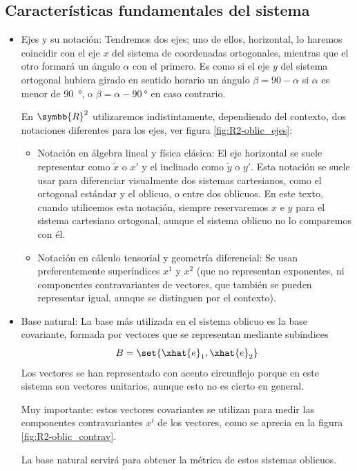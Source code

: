 \subsection{Características fundamentales del sistema}
\begin{itemize}
\item Ejes y su notación:
  Tendremos dos ejes; uno de ellos, horizontal, lo haremos coincidir con el eje $x$
  del sistema de coordenadas ortogonales, mientras que el otro formará un ángulo $\alpha$
  con el primero. Es como si el eje $y$ del sistema ortogonal hubiera girado en sentido
  horario un ángulo $\beta = \qty{90}-\alpha$ si $\alpha$ es menor de \qty{90}{\degree}, o
  $\beta = \alpha - \qty{90}{\degree}$ en caso contrario.
  
  En $\symbb{R}^2$ utilizaremos indistintamente, dependiendo del contexto, dos
  notaciones diferentes para los ejes, ver figura \ref{fig:R2-oblic_ejes}:
  \begin{itemize}
  \item Notación en álgebra lineal y física clásica:
    El eje horizontal se suele representar como $\tilde{x}$ o $x'$ y el inclinado como
    $\tilde{y}$ o $y'$.
    Esta notación se suele usar para diferenciar visualmente dos sistemas cartesianos,
    como el ortogonal estándar y el oblicuo, o entre dos oblicuos.
    En este texto, cuando utilicemos esta notación, siempre reservaremos $x$ e $y$ para
    el sistema cartesiano ortogonal, aunque el sistema oblicuo no lo comparemos con él.
  \item Notación en cálculo tensorial y geometría diferencial:
    Se usan preferentemente superíndices $x^1$ y $x^2$
    (que no representan exponentes, ni componentes contravariantes de vectores, que
    también se pueden representar igual, aunque se distinguen por el contexto).
  \end{itemize}
\item Base natural:
  La base más utilizada en el sistema oblicuo es la base covariante, formada por vectores
  que se representan mediante subíndices
  \[
    B = \set{\xhat{e}_1, \xhat{e}_2}
  \]
  Los vectores se han representado con acento circunflejo porque en este sistema son
  vectores unitarios, aunque esto no es cierto en general.

  Muy importante: estos vectores covariantes se utilizan para medir las componentes
  contravariantes $x^i$ de los vectores, como se aprecia en la figura
  \ref{fig:R2-oblic_contrav}.

  La base natural servirá para obtener la métrica de estos sistemas oblicuos.
\end{itemize}
